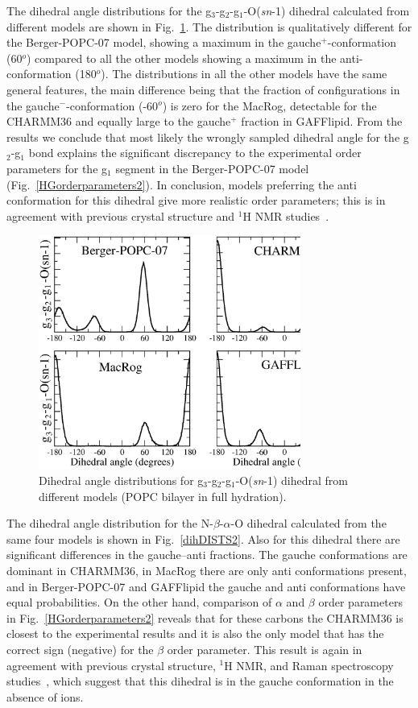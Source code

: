 \documentclass[journal=jpcbfk,manuscript=article]{achemso}
\begin{document}
The dihedral angle distributions for the  g$_3$-g$_2$-g$_1$-O(\textit{sn}-1) dihedral calculated from different models are
shown in Fig.~\ref{dihDISTS}. The distribution is qualitatively different for the Berger-POPC-07 model, showing a maximum in 
the gauche$^+$-conformation (60$^o$) compared to all the other models showing a maximum in the anti-conformation (180$^o$).
The distributions in all the other models have the same general features, the main difference being that the
fraction of configurations in the gauche$^-$-conformation (-60$^o$) is zero for the MacRog, detectable for the CHARMM36 and
equally large to the gauche$^+$ fraction in GAFFlipid. From the results we conclude that most likely the wrongly sampled
dihedral angle for the g$_2$-g$_1$ bond explains the significant discrepancy to the experimental order parameters
for the g$_1$ segment in the Berger-POPC-07 model (Fig.~\ref{HGorderparameters2}). 
In conclusion, models preferring the anti conformation for this dihedral give more realistic order parameters;
this is in agreement with previous crystal structure and $^1$H NMR studies~\cite{hauser80,hauser81,hauser81b,hauser88,pascher92,marsh06}.
\begin{figure}[]
  \centering
  \includegraphics[width=8.6cm]{../Fig/g1-g2_Cdihs2.eps}
  \caption{\label{dihDISTS}
    Dihedral angle distributions for g$_3$-g$_2$-g$_1$-O(\textit{sn}-1) dihedral from different models (POPC bilayer in full hydration).
      } 
\end{figure}

The dihedral angle distribution for the  N-$\beta$-$\alpha$-O dihedral calculated from the same four models is 
shown in Fig.~\ref{dihDISTS2}. Also for this dihedral there are significant differences in the gauche--anti fractions.
The gauche conformations are dominant in CHARMM36, in MacRog there are only anti conformations present,
and in Berger-POPC-07 and GAFFlipid the gauche and anti conformations have equal probabilities. 
On the other hand, comparison of $\alpha$ and $\beta$ order parameters in Fig.~\ref{HGorderparameters2}
reveals that for these carbons the CHARMM36 is closest to the experimental results and it is also the only model that has the correct
sign (negative) for the $\beta$ order parameter. This result is again in agreement with previous 
crystal structure, $^1$H NMR, and Raman spectroscopy studies~\cite{hauser80,hauser81,hauser81b,akutsu81b}, which suggest that
this dihedral is in the gauche conformation in the absence of ions.
\end{document}
